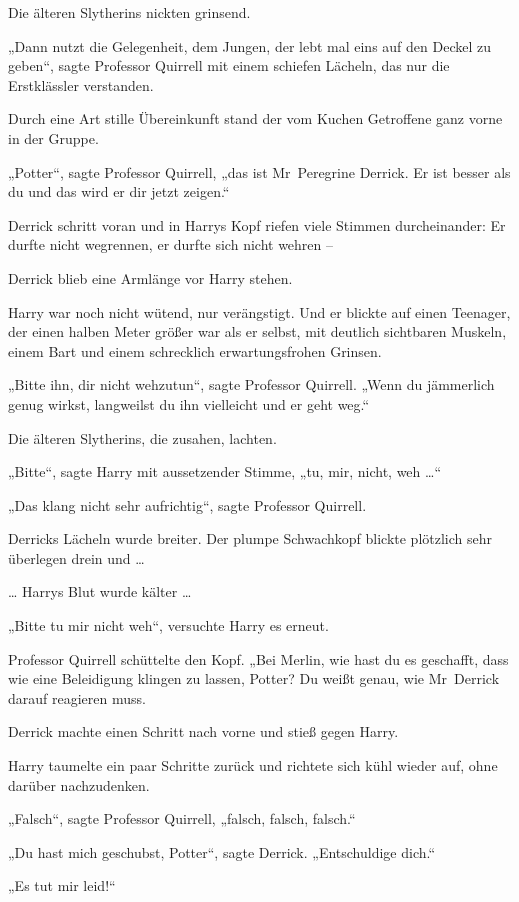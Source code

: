{Die älteren Slytherins nickten grinsend.

„Dann nutzt die Gelegenheit, dem Jungen, der lebt mal eins auf den Deckel zu geben“, sagte Professor Quirrell mit einem schiefen Lächeln, das nur die Erstklässler verstanden.

Durch eine Art stille Übereinkunft stand der vom Kuchen Getroffene ganz vorne in der Gruppe.

„Potter“, sagte Professor Quirrell, „das ist Mr~Peregrine Derrick. Er ist besser als du und das wird er dir jetzt zeigen.“

Derrick schritt voran und in Harrys Kopf riefen viele Stimmen durcheinander: Er durfte nicht wegrennen, er durfte sich nicht wehren --

Derrick blieb eine Armlänge vor Harry stehen.

Harry war noch nicht wütend, nur verängstigt. Und er blickte auf einen Teenager, der einen halben Meter größer war als er selbst, mit deutlich sichtbaren Muskeln, einem Bart und einem schrecklich erwartungsfrohen Grinsen.

„Bitte ihn, dir nicht wehzutun“, sagte Professor Quirrell. „Wenn du jämmerlich genug wirkst, langweilst du ihn vielleicht und er geht weg.“

Die älteren Slytherins, die zusahen, lachten.

„Bitte“, sagte Harry mit aussetzender Stimme, „tu, mir, nicht, weh …“

„Das klang nicht sehr aufrichtig“, sagte Professor Quirrell.

Derricks Lächeln wurde breiter. Der plumpe Schwachkopf blickte plötzlich sehr überlegen drein und …

… Harrys Blut wurde kälter …

„Bitte tu mir nicht weh“, versuchte Harry es erneut.

Professor Quirrell schüttelte den Kopf. „Bei Merlin, wie hast du es geschafft, dass wie eine Beleidigung klingen zu lassen, Potter? Du weißt genau, wie Mr~Derrick darauf reagieren muss.

Derrick machte einen Schritt nach vorne und stieß gegen Harry.

Harry taumelte ein paar Schritte zurück und richtete sich kühl wieder auf, ohne darüber nachzudenken.

„Falsch“, sagte Professor Quirrell, „falsch, falsch, falsch.“

„Du hast mich geschubst, Potter“, sagte Derrick. „Entschuldige dich.“

„Es tut mir leid!“

}
